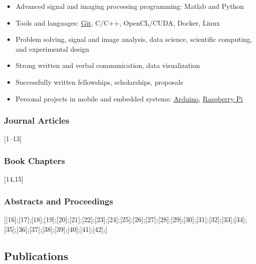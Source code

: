 \documentclass[
]{article}
\providecommand{\tightlist}{%
  \setlength{\itemsep}{0pt}\setlength{\parskip}{0pt}}
\begin{document}
\begin{itemize}
\tightlist
\item
  Advanced signal and imaging processing programming: Matlab and Python
\item
  Tools and languages: \href{http://git-scm.com/}{Git}, C/C++,
  OpenCL/CUDA, Docker, Linux
\item
  Problem solving, signal and image analysis, data science, scientific
  computing, and experimental design
\item
  Strong written and verbal communication, data visualization
\item
  Successfully written fellowships, scholarships, proposals
\item
  Personal projects in mobile and embedded systems:
  \href{http://www.arduino.cc/}{Arduino},
  \href{http://www.raspberrypi.org/}{Raspberry Pi}
\end{itemize}

\hypertarget{journal-articles}{%
\subsubsection{Journal Articles}\label{journal-articles}}

{[}1--13{]}

\hypertarget{book-chapters}{%
\subsubsection{Book Chapters}\label{book-chapters}}

{[}14,15{]}

\hypertarget{abstracts-and-proceedings}{%
\subsubsection{Abstracts and
Proceedings}\label{abstracts-and-proceedings}}

{[}{[}16{]};{[}17{]};{[}18{]};{[}19{]};{[}20{]};{[}21{]};{[}22{]};{[}23{]};{[}24{]};{[}25{]};{[}26{]};{[}27{]};{[}28{]};{[}29{]};{[}30{]};{[}31{]};{[}32{]};{[}33{]};{[}34{]};{[}35{]};{[}36{]};{[}37{]};{[}38{]};{[}39{]};{[}40{]};{[}41{]};{[}42{]};{]}

\hypertarget{publications}{%
\subsection*{Publications}\label{publications}}
\end{document}
